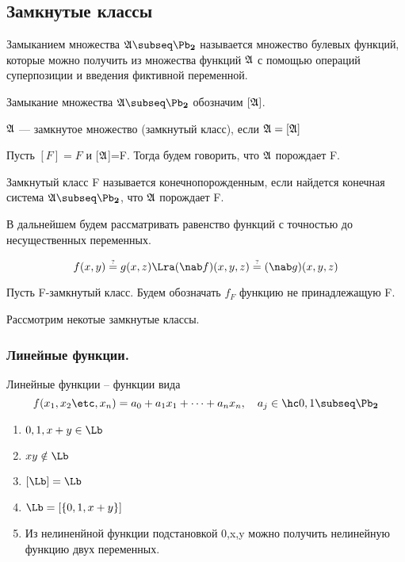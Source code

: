 \documentclass[unicode,10pt]{article}
\begin{document}
\subsection{Замкнутые классы}
\begin{df}
  Замыканием множества $\ag\subseq\PD$ называется множество булевых функций,
  которые можно получить из множества функций $\mathfrak{A}$ с помощью операций
  суперпозиции и введения фиктивной переменной.
\end{df}
\begin{denote}
  Замыкание множества $\ag\subseq\PD$ обозначим $[\mathfrak{A}]$.
\end{denote}
\begin{df}
  $\mathfrak{A}$ --- замкнутое множество (замкнутый класс), если $\mathfrak{A} = [\mathfrak{A}]$
\end{df}
\begin{df}
  Пусть $[F]=F$ и [$\mathfrak{A}$]=F. Тогда будем говорить, что $\mathfrak{A}$ порождает F.
\end{df}
\begin{df}
    Замкнутый класс F называется конечнопорожденным, если найдется конечная система
    $\ag\subseq\PD$, что $\mathfrak{A}$ порождает F.
\end{df}
\begin{prop}
  В дальнейшем будем рассматривать равенство функций с точностью до несущественных переменных.
  \begin{ex}
    \begin{displaymath}
      f(x,y)\queq g(x,z) \Lra (\nab f)(x,y,z) \queq (\nab g)(x,y,z)
    \end{displaymath}
  \end{ex}
\end{prop}
\begin{denote}
  Пусть F-замкнутый класс. Будем обозначать $f_F$ функцию не принадлежащую F.
\end{denote}
Рассмотрим некотые замкнутые классы.
\subsubsection{Линейные функции.}
  \begin{df}
    Линейные функции -- функции вида
    \begin{displaymath}
      f(\set[x]{n}) = a_0+a_1x_1+\cdots+a_nx_n, \quad \pcoef
    \end{displaymath}
  \end{df}
  \property
  \begin{enumerate}
    \item $0, 1, x+y\in\Lb$
    \item $xy\notin\Lb$
    \item $[\Lb] = \Lb$
    \item $\Lb = \cls{0,1,x+y}$
    \item
      \begin{stm}
	Из нелиненйной функции подстановкой 0,x,y можно получить
        нелинейную функцию двух переменных.
      \end{stm}
  \end{enumerate}
\end{document}
